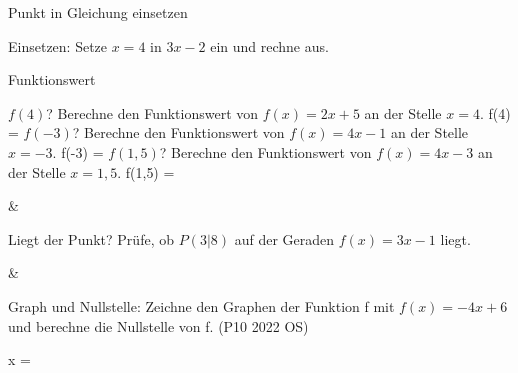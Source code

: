 \setcounter{aufgabe}{18}

\begin{aufgabe}{Punkt in Gleichung einsetzen}
\begin{teile}
\teil Einsetzen: Setze $x = 4$ in $3x - 2$ ein und rechne aus.
\end{teile}
\end{aufgabe}

\begin{aufgabe}{Funktionswert}
\begin{teile}
\teil $f(4)$? Berechne den Funktionswert von $f(x) = 2x + 5$ an der Stelle $x = 4$. f(4) = \leerfeld
\teil $f(-3)$? Berechne den Funktionswert von $f(x) = 4x - 1$ an der Stelle $x = -3$. f(-3) = \leerfeld
\teil $f(1{,}5)$? Berechne den Funktionswert von $f(x) = 4x - 3$ an der Stelle $x = 1{,}5$. f(1{,}5) = \leerfeld
\end{teile}
\begin{gleichungsraster}[2]
 &
\end{gleichungsraster}
\begin{teile}
\teil Liegt der Punkt? Prüfe, ob $P(3|8)$ auf der Geraden $f(x) = 3x - 1$ liegt. \janein
\end{teile}
\begin{gleichungsraster}[2]
 &
\end{gleichungsraster}
\begin{teile}
\teil Graph und Nullstelle: Zeichne den Graphen der Funktion f mit $f(x) = -4x + 6$ und berechne die Nullstelle von f. \hfill (P10 2022 OS) \\

\begin{ksys}[xmin=-4,xmax=4,ymin=-4,ymax=7] \end{ksys}
x = \leerfeld
\end{teile}
\end{aufgabe}

